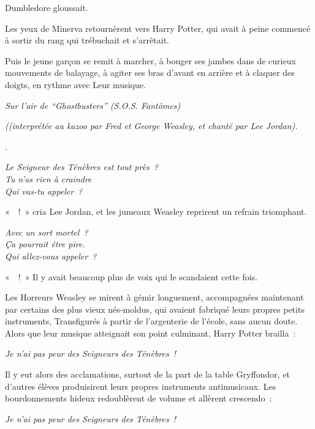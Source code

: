 Dumbledore gloussait.

Les yeux de Minerva retournèrent vers Harry Potter, qui avait à peine commencé à sortir du rang qui trébuchait et s'arrêtait.

Puis le jeune garçon se remit à marcher, à bouger ses jambes dans de curieux mouvements de balayage, à agiter ses bras d'avant en arrière et à claquer des doigts, en rythme avec Leur musique.

\begin{center}
\emph{Sur l'air de “Ghostbusters” (S.O.S. Fantômes)}

\emph{((interprétée au kazoo par Fred et George Weasley,
et chanté par Lee Jordan).}

.

\emph{Le Seigneur des Ténèbres est tout près~?\\
Tu n'as rien à craindre\\
Qui vas-tu appeler~?}
\end{center}

«~~!~» cria Lee Jordan, et les jumeaux Weasley reprirent un refrain triomphant.

\begin{center}
\emph{Avec un sort mortel~?\\
Ça pourrait être pire.\\
Qui allez-vous appeler~?}
\end{center}

«~~!~» Il y avait beaucoup plus de voix qui le scandaient cette fois.

Les Horreurs Weasley se mirent à gémir longuement, accompagnées maintenant par certains des plus vieux nés-moldus, qui avaient fabriqué leurs propres petits instruments, Transfigurés à partir de l'argenterie de l'école, sans aucun doute. Alors que leur musique atteignait son point culminant, Harry Potter brailla~:

\begin{center}
\emph{Je n'ai pas peur des Seigneurs des Ténèbres~!}
\end{center}

Il y eut alors des acclamations, surtout de la part de la table Gryffondor, et d'autres élèves produisirent leurs propres instruments antimusicaux. Les bourdonnements hideux redoublèrent de volume et allèrent crescendo~:

\begin{center}
\emph{Je n'ai pas peur des Seigneurs des Ténèbres~!}
\end{center}

